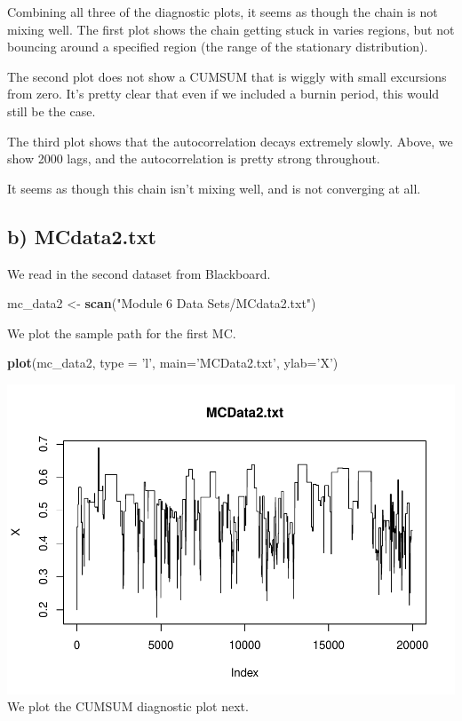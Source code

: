 \documentclass[]{article}
\newenvironment{Shaded}{\begin{snugshade}}{\end{snugshade}}
\newcommand{\KeywordTok}[1]{\textcolor[rgb]{0.13,0.29,0.53}{\textbf{{#1}}}}
\newcommand{\DataTypeTok}[1]{\textcolor[rgb]{0.13,0.29,0.53}{{#1}}}
\newcommand{\StringTok}[1]{\textcolor[rgb]{0.31,0.60,0.02}{{#1}}}
\newcommand{\NormalTok}[1]{{#1}}
\begin{document}
Combining all three of the diagnostic plots, it seems as though the
chain is not mixing well. The first plot shows the chain getting stuck
in varies regions, but not bouncing around a specified region (the range
of the stationary distribution).

The second plot does not show a CUMSUM that is wiggly with small
excursions from zero. It's pretty clear that even if we included a
burnin period, this would still be the case.

The third plot shows that the autocorrelation decays extremely slowly.
Above, we show 2000 lags, and the autocorrelation is pretty strong
throughout.

It seems as though this chain isn't mixing well, and is not converging
at all.

\subsection{b) MCdata2.txt}\label{b-mcdata2.txt}

We read in the second dataset from Blackboard.

\begin{Shaded}
\begin{Highlighting}[]
\NormalTok{mc_data2 <-}\StringTok{ }\KeywordTok{scan}\NormalTok{(}\StringTok{"Module 6 Data Sets/MCdata2.txt"}\NormalTok{)}
\end{Highlighting}
\end{Shaded}

We plot the sample path for the first MC.

\begin{Shaded}
\begin{Highlighting}[]
\KeywordTok{plot}\NormalTok{(mc_data2, }\DataTypeTok{type =}  \StringTok{'l'}\NormalTok{, }\DataTypeTok{main=}\StringTok{'MCData2.txt'}\NormalTok{, }\DataTypeTok{ylab=}\StringTok{'X'}\NormalTok{)}
\end{Highlighting}
\end{Shaded}

\includegraphics{Atlas-PS_6_files/figure-latex/unnamed-chunk-8-1.pdf} We
plot the CUMSUM diagnostic plot next.
\end{document}

